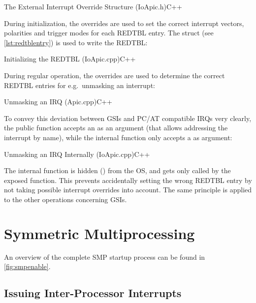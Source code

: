 \begin{codeblock}{The External Interrupt Override Structure (IoApic.h)}{C++}
\end{codeblock}

During initialization, the overrides are used to set the correct interrupt vectors, polarities and trigger modes for each REDTBL entry.
The  struct (see \autoref{lst:redtblentry}) is used to write the REDTBL\@:

\begin{codeblock}{Initializing the REDTBL (IoApic.cpp)}{C++}
\end{codeblock}

During regular operation, the overrides are used to determine the correct REDTBL entries for e.g.\ unmasking an interrupt:

\begin{codeblock}{Unmasking an IRQ (Apic.cpp)}{C++}
\end{codeblock}

To convey this deviation between GSIs and PC/AT compatible IRQs very clearly, the public  function accepts an  as an argument (that allows addressing the interrupt by name), while the internal  function only accepts a  as argument:

\begin{codeblock}{Unmasking an IRQ Internally (IoApic.cpp)}{C++}
\end{codeblock}

The internal  function is hidden () from the OS, and gets only called by the exposed  function.
This prevents accidentally setting the wrong REDTBL entry by not taking possible interrupt overrides into account.
The same principle is applied to the other operations concerning GSIs.

\clearpage

\section{Symmetric Multiprocessing}
\label{sec:apxsymmetric}

An overview of the complete SMP startup process can be found in \autoref{fig:smpenable}.

\subsection{Issuing Inter-Processor Interrupts}
\label{subsec:apxipis}

